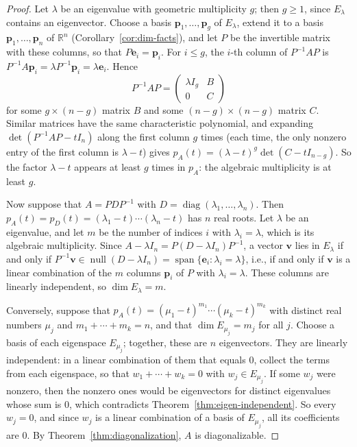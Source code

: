 \documentclass[11pt]{article}
\theoremstyle{definition}
\theoremstyle{plain}
\theoremstyle{remark}
\DeclareMathOperator{\Null}{null}
\DeclareMathOperator{\Span}{span}
\DeclareMathOperator{\diag}{diag}
\begin{document}
\begin{proof}
    Let $\lambda$ be an eigenvalue with geometric multiplicity $g$; then $g \geq 1$, since $E_\lambda$ contains an eigenvector. Choose a basis $\mathbf{p}_1, \ldots, \mathbf{p}_g$ of $E_\lambda$, extend it to a basis $\mathbf{p}_1, \ldots, \mathbf{p}_n$ of $\mathbb{R}^n$ (Corollary~\ref{cor:dim-facts}), and let $P$ be the invertible matrix with these columns, so that $P\mathbf{e}_i = \mathbf{p}_i$. For $i \leq g$, the $i$-th column of $P^{-1}AP$ is $P^{-1}A\mathbf{p}_i = \lambda P^{-1}\mathbf{p}_i = \lambda \mathbf{e}_i$. Hence
    \[P^{-1}AP = \begin{pmatrix} \lambda I_g & B \\ 0 & C \end{pmatrix}\]
    for some $g \times (n - g)$ matrix $B$ and some $(n - g) \times (n - g)$ matrix $C$. Similar matrices have the same characteristic polynomial, and expanding $\det(P^{-1}AP - tI_n)$ along the first column $g$ times (each time, the only nonzero entry of the first column is $\lambda - t$) gives $p_A(t) = (\lambda - t)^g \det(C - tI_{n-g})$. So the factor $\lambda - t$ appears at least $g$ times in $p_A$: the algebraic multiplicity is at least $g$.

    Now suppose that $A = PDP^{-1}$ with $D = \diag(\lambda_1, \ldots, \lambda_n)$. Then $p_A(t) = p_D(t) = (\lambda_1 - t) \cdots (\lambda_n - t)$ has $n$ real roots. Let $\lambda$ be an eigenvalue, and let $m$ be the number of indices $i$ with $\lambda_i = \lambda$, which is its algebraic multiplicity. Since $A - \lambda I_n = P(D - \lambda I_n)P^{-1}$, a vector $\mathbf{v}$ lies in $E_\lambda$ if and only if $P^{-1}\mathbf{v} \in \Null(D - \lambda I_n) = \Span\{\mathbf{e}_i : \lambda_i = \lambda\}$, i.e., if and only if $\mathbf{v}$ is a linear combination of the $m$ columns $\mathbf{p}_i$ of $P$ with $\lambda_i = \lambda$. These columns are linearly independent, so $\dim E_\lambda = m$.

    Conversely, suppose that $p_A(t) = (\mu_1 - t)^{m_1} \cdots (\mu_k - t)^{m_k}$ with distinct real numbers $\mu_j$ and $m_1 + \cdots + m_k = n$, and that $\dim E_{\mu_j} = m_j$ for all $j$. Choose a basis of each eigenspace $E_{\mu_j}$; together, these are $n$ eigenvectors. They are linearly independent: in a linear combination of them that equals $0$, collect the terms from each eigenspace, so that $w_1 + \cdots + w_k = 0$ with $w_j \in E_{\mu_j}$. If some $w_j$ were nonzero, then the nonzero ones would be eigenvectors for distinct eigenvalues whose sum is $0$, which contradicts Theorem~\ref{thm:eigen-independent}. So every $w_j = 0$, and since $w_j$ is a linear combination of a basis of $E_{\mu_j}$, all its coefficients are $0$. By Theorem~\ref{thm:diagonalization}, $A$ is diagonalizable.
\end{proof}
\end{document}
